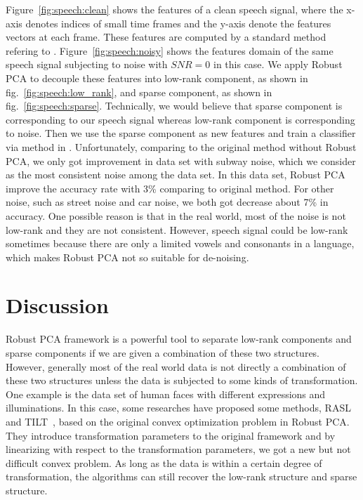 \documentclass{../../common/projectreport}
\begin{document}
Figure~\ref{fig:speech:clean} shows the features of a clean speech signal, where the x-axis denotes indices of small time frames and the y-axis denote the features vectors at each frame. These features are computed by a standard method refering to \cite{}. Figure~\ref{fig:speech:noisy} shows the features domain of the same speech signal subjecting to noise with $SNR = 0$ in this case. We apply Robust PCA to decouple these features into low-rank component, as shown in fig.~\ref{fig:speech:low_rank}, and sparse component, as shown in fig.~\ref{fig:speech:sparse}. Technically, we would believe that sparse component is corresponding to our speech signal whereas low-rank component is corresponding to noise. Then we use the sparse component as new features and train a classifier via method in \cite{}. Unfortunately, comparing to the original method without  Robust PCA, we only got improvement in data set with subway noise, which we consider as the most consistent noise among the data set. In this data set, Robust PCA improve the accuracy rate with 3\% comparing to original method. For other noise, such as street noise and car noise, we both got decrease about 7\% in accuracy. One possible reason is that in the real world, most of the noise is not low-rank and they are not consistent. However, speech signal could be low-rank sometimes because there are only a limited vowels and consonants in a language, which makes Robust PCA not so suitable for de-noising.  

\section{Discussion}
Robust PCA framework is a powerful tool to separate low-rank components and sparse components if we are given a combination of these two structures. However, generally most of the real world data is not directly a combination of these two structures unless the data is subjected to some kinds of transformation. One example is the data set of human faces with different expressions and illuminations. In this case, some researches have proposed some methods, RASL~\cite{Peng:2010} and TILT~\cite{Zhang:2011}, based on the original convex optimization problem in Robust PCA. They introduce transformation parameters to the original framework and by linearizing with respect to the transformation parameters, we got a new but not difficult convex problem. As long as the data is within a certain degree of transformation, the algorithms can still recover the low-rank structure and sparse structure.
\end{document}
